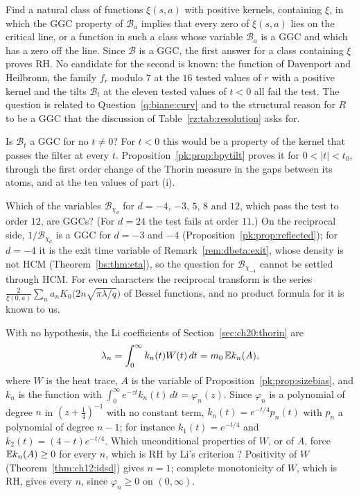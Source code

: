 \begin{problem}\label{pk:prob:ggc}
Find a natural class of functions $\xi(s,a)$ with positive kernels, containing $\xi$, in which the GGC property of $\mathcal B_a$ implies that every zero of $\xi(s,a)$ lies on the critical line, or a function in such a class whose variable $\mathcal B_a$ is a GGC and which has a zero off the line. Since $\mathcal B$ is a GGC, the first answer for a class containing $\xi$ proves RH. No candidate for the second is known: the function of Davenport and Heilbronn, the family $f_r$ modulo $7$ at the $16$ tested values of $r$ with a positive kernel and the tilts $\mathcal B_t$ at the eleven tested values of $t<0$ all fail the test. The question is related to Question~\ref{q:biane:curv} and to the structural reason for $R$ to be a GGC that the discussion of Table~\ref{rz:tab:resolution} asks for.
\end{problem}

\begin{problem}\label{pk:prob:tilt}
Is $\mathcal B_t$ a GGC for no $t\ne0$? For $t<0$ this would be a property of the kernel that passes the filter at every $t$. Proposition~\ref{pk:prop:bpytilt} proves it for $0<|t|<t_0$, through the first order change of the Thorin measure in the gaps between its atoms, and at the ten values of part (i).
\end{problem}

\begin{problem}\label{pk:prob:side}
Which of the variables $\mathcal B_{\chi_d}$ for $d=-4$, $-3$, $5$, $8$ and $12$, which pass the test to order $12$, are GGCs? (For $d=24$ the test fails at order $11$.) On the reciprocal side, $1/\mathcal B_{\chi_d}$ is a GGC for $d=-3$ and $-4$ (Proposition~\ref{pk:prop:reflected}); for $d=-4$ it is the exit time variable of Remark~\ref{rem:dbeta:exit}, whose density is not HCM (Theorem~\ref{bs:thm:eta}), so the question for $\mathcal B_{\chi_{-4}}$ cannot be settled through HCM. For even characters the reciprocal transform is the series $\frac2{\xi(0,a)}\sum_na_nK_0\big(2n\sqrt{\pi\lambda/q}\big)$ of Bessel functions, and no product formula for it is known to us.
\end{problem}

\begin{problem}\label{pk:prob:li}
With no hypothesis, the Li coefficients of Section~\ref{sec:ch20:thorin} are
\[
\lambda_n=\int_0^\infty k_n(t)W(t)\,dt=m_0\,\mathbb{E} k_n(A),
\]
where $W$ is the heat trace, $A$ is the variable of Proposition~\ref{pk:prop:sizebias}, and $k_n$ is the function with $\int_0^\infty e^{-zt}k_n(t)\,dt=\varphi_n(z)$. Since $\varphi_n$ is a polynomial of degree $n$ in $(z+\frac14)^{-1}$ with no constant term, $k_n(t)=e^{-t/4}p_n(t)$ with $p_n$ a polynomial of degree $n-1$; for instance $k_1(t)=e^{-t/4}$ and $k_2(t)=(4-t)e^{-t/4}$. Which unconditional properties of $W$, or of $A$, force $\mathbb{E} k_n(A)\ge0$ for every $n$, which is RH by Li's criterion \cite{Li97,BL99}? Positivity of $W$ (Theorem~\ref{thm:ch12:idsd}) gives $n=1$; complete monotonicity of $W$, which is RH, gives every $n$, since $\varphi_n\ge0$ on $(0,\infty)$.
\end{problem}

